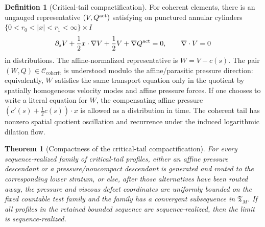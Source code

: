 \documentclass[11pt]{amsart}
\numberwithin{equation}{section}
\theoremstyle{plain}
\newtheorem{theorem}{Theorem}[section]
\theoremstyle{definition}
\newtheorem{definition}[definition]{Definition}
\theoremstyle{remark}
\newcommand{\Ccohcrit}{\mathcal C_{\mathrm{cohcrit}}}
\newcommand{\Tcrit}{\mathfrak T_M}
\begin{document}
\begin{definition}[Critical-tail compactification]
For coherent elements, there is an ungauged representative
\((V,Q^{\rm act})\) satisfying on punctured annular cylinders
\(\{0<r_0<|x|<r_1<\infty\}\times I\)
\[
   \partial_s V+\frac12 x\cdot\nabla V+\frac12V+\nabla Q^{\rm act}=0,
   \qquad
   \nabla\cdot V=0
\]
in distributions.  The affine-normalized representative is
\(W=V-c(s)\).  The pair \((W,Q)\in\Ccohcrit\) is understood modulo the
affine/parasitic pressure direction: equivalently, \(W\) satisfies the same
transport equation only in the quotient by spatially homogeneous velocity modes
and affine pressure forces.  If one chooses to write a literal equation for
\(W\), the compensating affine pressure
\((c'(s)+\tfrac12c(s))\cdot x\) is allowed as a distribution in time.  The
coherent tail has nonzero spatial quotient oscillation and recurrence under the
induced logarithmic dilation flow.
\end{definition}

\begin{theorem}[Compactness of the critical-tail compactification]
\label{thm:critical-tail-compactification-compactness}
For every sequence-realized family of critical-tail profiles, either an affine
pressure descendant or a pressure/noncompact descendant is generated and routed
to the corresponding lower stratum, or else, after those alternatives have been
routed away, the pressure and viscous defect coordinates are uniformly bounded
on the fixed countable test family and the family has a convergent subsequence
in \(\Tcrit\).  If all profiles in the retained bounded sequence are
sequence-realized, then the limit is sequence-realized.
\end{theorem}
\end{document}
